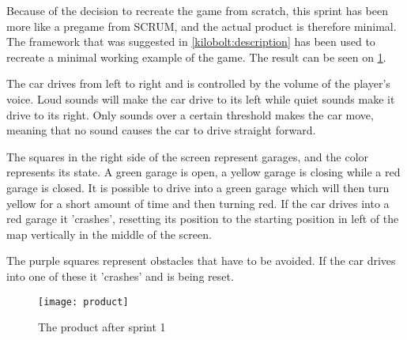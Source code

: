 Because of the decision to recreate the game from scratch, this sprint has been more like a pregame from SCRUM, and the actual product is therefore minimal.
The framework that was suggested in \cref{kilobolt:description} has been used to recreate a minimal working example of the game.
The result can be seen on \ref{product-sprint1}.

The car drives from left to right and is controlled by the volume of the player's voice. 
Loud sounds will make the car drive to its left while quiet sounds make it drive to its right.
Only sounds over a certain threshold makes the car move, meaning that no sound causes the car to drive straight forward.

The squares in the right side of the screen represent garages, and the color represents its state. 
A green garage is open, a yellow garage is closing while a red garage is closed.
It is possible to drive into a green garage which will then turn yellow for a short amount of time and then turning red.
If the car drives into a red garage it 'crashes', resetting its position to the starting position in left of the map vertically in the middle of the screen.

The purple squares represent obstacles that have to be avoided. 
If the car drives into one of these it 'crashes' and is being reset.


\begin{figure}
\texttt{[image: product]}
\caption{The product after sprint 1}
\label{product-sprint1}
\end{figure}